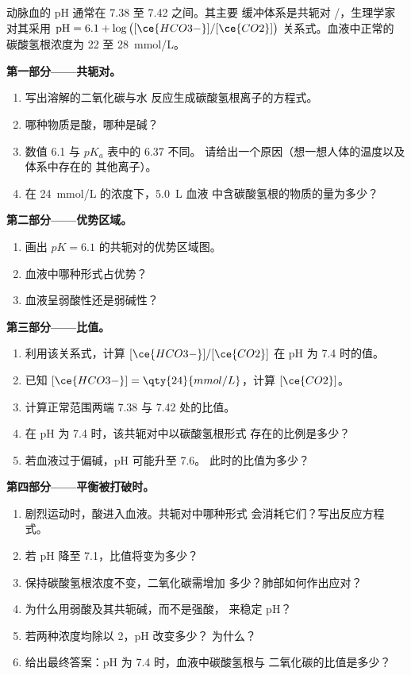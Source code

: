 \begin{problem}
\label{pb:g12:buffers-predominance:1}
动脉血的 pH 通常在 7.38 至 7.42 之间。其主要
缓冲体系是共轭对 /，生理学家对其采用
$\mathrm{pH} = 6.1 + \log\big([\ce{HCO3-}]/[\ce{CO2}]\big)$ 关系式。血液中正常的
碳酸氢根浓度为 22 至 \qty{28}{mmol/L}。

\medskip
\noindent\textbf{第一部分——共轭对。}
\begin{enumerate}
  \item 写出溶解的二氧化碳与水
        反应生成碳酸氢根离子的方程式。
  \item 哪种物质是酸，哪种是碱？
  \item 数值 6.1 与 $pK_a$ 表中的 6.37 不同。
        请给出一个原因（想一想人体的温度以及体系中存在的
        其他离子）。
  \item 在 \qty{24}{mmol/L} 的浓度下，\qty{5.0}{L} 血液
        中含碳酸氢根的物质的量为多少？
\end{enumerate}

\medskip
\noindent\textbf{第二部分——优势区域。}
\begin{enumerate}[resume]
  \item 画出 $pK = 6.1$ 的共轭对的优势区域图。
  \item 血液中哪种形式占优势？
  \item 血液呈弱酸性还是弱碱性？
\end{enumerate}

\medskip
\noindent\textbf{第三部分——比值。}
\begin{enumerate}[resume]
  \item 利用该关系式，计算 $[\ce{HCO3-}]/[\ce{CO2}]$
        在 pH 为 7.4 时的值。
  \item 已知 $[\ce{HCO3-}] = \qty{24}{mmol/L}$，计算 $[\ce{CO2}]$。
  \item 计算正常范围两端 7.38 与
        7.42 处的比值。
  \item 在 pH 为 7.4 时，该共轭对中以碳酸氢根形式
        存在的比例是多少？
  \item 若血液过于偏碱，pH 可能升至 7.6。
        此时的比值为多少？
\end{enumerate}

\medskip
\noindent\textbf{第四部分——平衡被打破时。}
\begin{enumerate}[resume]
  \item 剧烈运动时，酸进入血液。共轭对中哪种形式
        会消耗它们？写出反应方程式。
  \item 若 pH 降至 7.1，比值将变为多少？
  \item 保持碳酸氢根浓度不变，二氧化碳需增加
        多少？肺部如何作出应对？
  \item 为什么用弱酸及其共轭碱，而不是强酸，
        来稳定 pH？
  \item 若两种浓度均除以 2，pH 改变多少？
        为什么？
  \item 给出最终答案：pH 为 7.4 时，血液中碳酸氢根与
        二氧化碳的比值是多少？
\end{enumerate}
\end{problem}
